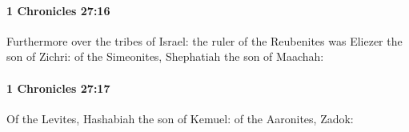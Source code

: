 		\paragraph{1 Chronicles 27:16} %
			\label{1CHRONICLES-27-16}

			Furthermore over the tribes of Israel: the ruler of the Reubenites was Eliezer the son of Zichri: of the Simeonites, Shephatiah the son of Maachah:


		\paragraph{1 Chronicles 27:17} %
			\label{1CHRONICLES-27-17}

			Of the Levites, Hashabiah the son of Kemuel: of the Aaronites, Zadok:



